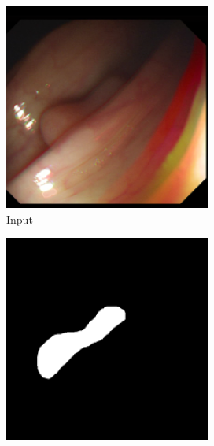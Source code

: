 \begin{figure}
	\centering
	\begin{subfigure}{.19\textwidth}
		\centering
		\includegraphics[width=.9\linewidth]{img/results/b64_input}
		\caption{Input}
	\end{subfigure}
	\begin{subfigure}{.19\textwidth}
		\centering
		\includegraphics[width=.9\linewidth]{img/results/b64_target}

\end{subfigure}
\end{figure}
